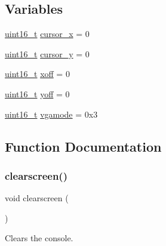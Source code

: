 \subsection*{Variables}
\begin{DoxyCompactItemize}
\item 
\hyperlink{a00134_a273cf69d639a59973b6019625df33e30_a273cf69d639a59973b6019625df33e30}{uint16\+\_\+t} \hyperlink{a00167_ae69604af0f9bd5fca2a016d0aa1ba7e1_ae69604af0f9bd5fca2a016d0aa1ba7e1}{cursor\+\_\+x} = 0
\item 
\hyperlink{a00134_a273cf69d639a59973b6019625df33e30_a273cf69d639a59973b6019625df33e30}{uint16\+\_\+t} \hyperlink{a00167_a0301c5492919c401c2c1ecf52af709b0_a0301c5492919c401c2c1ecf52af709b0}{cursor\+\_\+y} = 0
\item 
\hyperlink{a00134_a273cf69d639a59973b6019625df33e30_a273cf69d639a59973b6019625df33e30}{uint16\+\_\+t} \hyperlink{a00167_abaa0d20f0e52ce0d3a7d706f6ac16266_abaa0d20f0e52ce0d3a7d706f6ac16266}{xoff} = 0
\item 
\hyperlink{a00134_a273cf69d639a59973b6019625df33e30_a273cf69d639a59973b6019625df33e30}{uint16\+\_\+t} \hyperlink{a00167_a1a7539764d0ae8cd06ce45c62cf92bca_a1a7539764d0ae8cd06ce45c62cf92bca}{yoff} = 0
\item 
\hyperlink{a00134_a273cf69d639a59973b6019625df33e30_a273cf69d639a59973b6019625df33e30}{uint16\+\_\+t} \hyperlink{a00167_af93b0649fdd1bea5b6d29ed37205aa2c_af93b0649fdd1bea5b6d29ed37205aa2c}{vgamode} = 0x3
\end{DoxyCompactItemize}


\subsection{Function Documentation}
\mbox{\label{a00167_aff4bc17c602603d120756f52e18ebb96_aff4bc17c602603d120756f52e18ebb96}} 
\subsubsection{\texorpdfstring{clearscreen()}{clearscreen()}}
{\footnotesize\ttfamily void clearscreen (\begin{DoxyParamCaption}{ }\end{DoxyParamCaption})}



Clears the console. 




